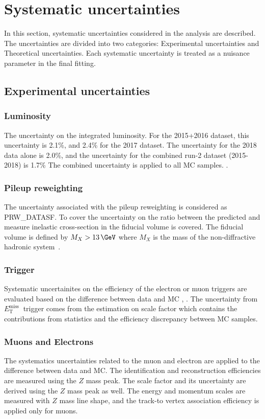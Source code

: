 \chapter{Systematic uncertainties}
\label{chap:systematics}
In this section, systematic uncertainties considered in the analysis are described. The uncertainties are divided into two categories:
Experimental uncertainties and Theoretical uncertainties.
Each systematic uncertainty is treated as a nuisance parameter in the final fitting.

\section{Experimental uncertainties}
\subsection{Luminosity}
The uncertainty on the integrated luminosity. 
For the 2015+2016 dataset, this uncertainty is 2.1\%, and 2.4\% for the 2017 dataset. The uncertainty for the 2018 data alone is 2.0\%, and the uncertainty for the combined run-2 dataset (2015-2018) is 1.7\% The combined uncertainty is applied to all MC samples. \cite{AtlasLumiRun2}.
\subsection{Pileup reweighting}
The uncertainty associated with the pileup reweighting is considered\cite{ExtendedPileupReweighting} as PRW\_DATASF. To cover the uncertainty on the ratio between the predicted and measure inelastic cross-section in the fiducial volume is covered. The fiducial volume is defined by $M_X > 13\,\GeV$ where $M_X$ is the mass of the non-diffractive hadronic system~\cite{STDM-2015-05}.
\subsection{Trigger}
Systematic uncertainites on the efficiency of the electron or muon triggers are evaluated based on the difference between data and MC \cite{PERF-2016-01}, \cite{MUON-2018-03}. The uncertainty from $E_{\mathrm{T}}^{\text {miss }}$ trigger comes from the estimation on scale factor which contains the contributions from statistics and the efficiency discrepancy between MC samples.
\subsection{Muons and Electrons}
The systematics uncertainties related to the muon and electron are applied to the difference between data and MC. The identification and reconstruction efficiencies are measured using the $Z$ mass peak. The scale factor and its uncertainty are derived using the $Z$ mass peak as well. The energy and momentum scales are measured with $Z$ mass line shape, and the track-to vertex association efficiency is applied only for muons.

